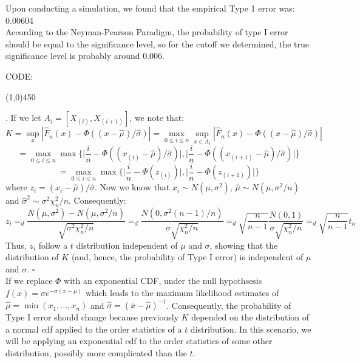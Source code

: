 \documentclass[12pt]{article}
\begin{document}
\noindent
Upon conducting a simulation, we found that the empirical Type 1 error was: 0.00604\\

\noindent
According to the Neyman-Pearson Paradigm, the probability of type I error should be equal to the significance level, so for the cutoff we determined, the true significance level is probably around 0.006.

\pagebreak
\noindent
CODE:


 \begin{center}
\line(1,0){450}
\end{center}

. If we let $A_i = [X_{(i)},X_{(i+1)}]$, we note that:
$$K = \sup_x |\hat{F}_n(x)-\Phi((x-\hat{\mu})/\hat{\sigma})|
= \max_{0 \leq i \leq n} \sup_{x\in A_i} |\hat{F}_n(x)-\Phi((x-\hat{\mu})/\hat{\sigma})|$$
$$= \max_{0 \leq i \leq n} \max \biggl\{ \biggl| \frac{i}{n}-\Phi((x_{(i)}-\hat{\mu})/\hat{\sigma}) \biggr|, \biggr| \frac{i}{n}-\Phi((x_{(i+1)}-\hat{\mu})/\hat{\sigma}) \biggr| \biggr\}$$
$$= \max_{0 \leq i \leq n} \max \biggl\{ \biggl| \frac{i}{n}-\Phi(z_{(i)}) \biggr|,  \biggr| \frac{i}{n}-\Phi(z_{(i+1)}) \biggr| \biggr\}$$
where $z_i = (x_i-\hat{\mu})/\hat{\sigma}$. Now we know that $x_i \sim N(\mu,\sigma^2)$, $\hat{\mu} \sim N(\mu,\sigma^2/n)$ and $\hat{\sigma}^2 \sim \sigma^2 \chi_n^2 /n$. Consequently:
$$z_i =_d \frac{N(\mu,\sigma^2)-N(\mu,\sigma^2/n)}{\sqrt{\sigma^2 \chi_n^2/n}}
=_d \frac{N(0,\sigma^2(n-1)/n)}{\sigma \sqrt{\chi_n^2/n}}
=_d \sqrt{\frac{n}{n-1}}\frac{N(0,1)}{\sigma \sqrt{\chi_n^2/n}} 
=_d \sqrt{\frac{n}{n-1}} t_{n}$$
Thus, $z_i$ follow a $t$ distribution independent of $\mu$ and $\sigma$, showing that the distribution of $K$ (and, hence, the probability of Type I error) is independent of $\mu$ and $\sigma$. $\square$\\

\noindent
If we replace $\Phi$ with an exponential CDF, under the null hypothsesis $f(x) = \sigma e^{-\sigma(x-\mu)}$ which leads to the maximum likelihood estimates of $\hat{\mu} = \min(x_1,\dots,x_n)$ and $\hat{\sigma} = (\bar{x}-\hat{\mu})^{-1}$. Consequently, the probability of Type I error should change because previously $K$ depended on the distribution of a normal cdf applied to the order statistics of a $t$ distribution. In this scenario, we will be applying an exponential cdf to the order statistics of some other distribution, possibly more complicated than the $t$. 
\end{document}
